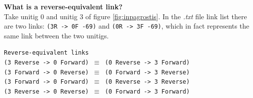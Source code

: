 \documentclass[12pt, twocolumn]{article}
\begin{document}
\textbf{What is a reverse-equivalent link?}\\ Take unitig 0 and unitig 3 of figure \ref{fig:inpagrostis}. In the \textit{.txt} file link list there are two links: \texttt{(3R -> 0F -69)} and \texttt{(0R -> 3F -69)}, which in fact represents the same link between the two unitigs. \\
\vspace{-0.7cm}
\begin{center}
\texttt{Reverse-equivalent links}\\
\texttt{(3 Reverse -> 0 Forward) $\equiv$ (0 Reverse -> 3 Forward)}\\
\texttt{(3 Forward -> 0 Reverse) $\equiv$ (0 Forward -> 3 Reverse)}\\
\texttt{(3 Forward -> 0 Forward) $\equiv$ (0 Reverse -> 3 Reverse)}\\
\texttt{(3 Reverse -> 0 Reverse) $\equiv$ (0 Forward ->  3 Forward)}\\
\vspace{-0.5cm}
\end{center}
\end{document}
